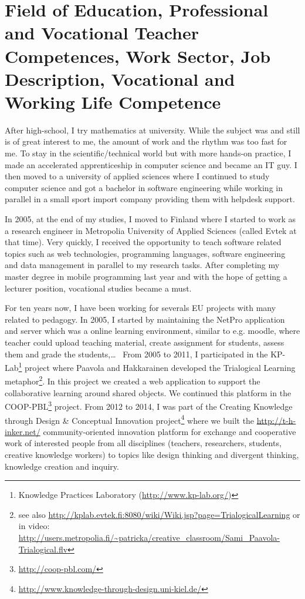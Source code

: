 \section{Field of Education, Professional and Vocational Teacher Competences, Work Sector, Job Description, Vocational and Working Life Competence}

After high-school, I try mathematics at university. While the subject was and still is of great interest to me, the amount of work and the rhythm was too fast for me. 
To stay in the scientific/technical world but with more hands-on practice, I made an accelerated apprenticeship in computer science and became an IT guy. 
I then moved to a university of applied sciences where I continued to study computer science and got a bachelor in software engineering while working in parallel in a small sport import company providing them with helpdesk support.

In 2005, at the end of my studies, I moved to Finland where I started to work as a research engineer in Metropolia University of Applied Sciences (called Evtek at that time). 
Very quickly, I received the opportunity to teach software related topics such as web technologies, programming languages, software engineering and data management in parallel to my research tasks. 
After completing my master degree in mobile programming last year and with the hope of getting a lecturer position, vocational studies became a must.

For ten years now, I have been working for severals EU projects with many related to pedagogy. 
In 2005, I started by maintaining the NetPro application and server which was a online learning environment, similar to e.g. moodle, where teacher could upload teaching material, create assignment for students, assess them and grade the students,\ldots
~From 2005 to 2011, I participated in the KP-Lab\footnote{Knowledge Practices Laboratory (\url{http://www.kp-lab.org/})} project where Paavola and Hakkarainen \cite{Paavola_2005} developed the Trialogical Learning metaphor\footnote{see also \url{http://kplab.evtek.fi:8080/wiki/Wiki.jsp?page=TrialogicalLearning} or in video: \url{http://users.metropolia.fi/~patricka/creative_classroom/Sami_Paavola-Trialogical.flv}}. In this project we created a web application to support the collaborative learning around shared objects.
We continued this platform in the COOP-PBL\footnote{\url{http://coop-pbl.com/}} project.
From 2012 to 2014, I was part of the Creating Knowledge through Design \& Conceptual Innovation project\footnote{\url{http://www.knowledge-through-design.uni-kiel.de/}} where we built the \url{http://t-h-inker.net/} community-oriented innovation platform for exchange and cooperative work of interested people from all disciplines (teachers, researchers, students, creative knowledge workers) to topics like design thinking and divergent thinking, knowledge creation and inquiry. 

